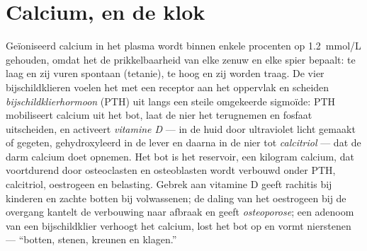 \section{Calcium, en de klok}

\begin{definition}[Calciumhomeostase]\label{def:b3:endocrinology:calcium}
Geïoniseerd calcium in het plasma wordt binnen enkele procenten op
\qty{1.2}{mmol/L} gehouden, omdat het de prikkelbaarheid van elke zenuw
en elke spier bepaalt: te laag en zij vuren spontaan (tetanie), te hoog
en zij worden traag. De vier bijschildklieren voelen het met een
receptor aan het oppervlak en scheiden \emph{bijschildklierhormoon}
(PTH) uit langs een steile omgekeerde sigmoïde: PTH mobiliseert calcium
uit het bot, laat de nier het terugnemen en fosfaat uitscheiden, en
activeert \emph{vitamine D} --- in de huid door ultraviolet licht
gemaakt of gegeten, gehydroxyleerd in de lever en daarna in de nier tot
\emph{calcitriol} --- dat de darm calcium doet opnemen. Het bot is het
reservoir, een kilogram calcium, dat voortdurend door osteoclasten en
osteoblasten wordt verbouwd onder PTH, calcitriol, oestrogeen en
belasting. Gebrek aan vitamine D geeft rachitis bij kinderen en zachte
botten bij volwassenen; de daling van het oestrogeen bij de overgang
kantelt de verbouwing naar afbraak en geeft \emph{osteoporose}; een
adenoom van een bijschildklier verhoogt het calcium, lost het bot op en
vormt nierstenen --- ``botten, stenen, kreunen en klagen.''
\end{definition}

